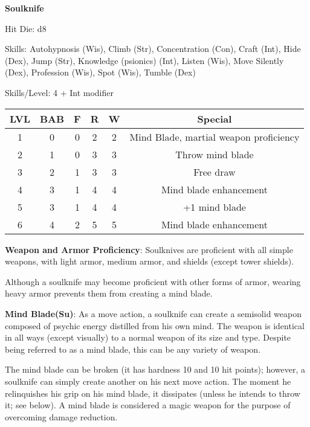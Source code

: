 \textbf{\huge{Soulknife}}

Hit Die: d8

Skills: Autohypnosis (Wis), Climb (Str), Concentration (Con), Craft (Int), Hide (Dex), Jump (Str), Knowledge (psionics) (Int), Listen (Wis), Move Silently (Dex), Profession (Wis), Spot (Wis), Tumble (Dex)

Skills/Level: 4 + Int modifier

\begin{center}
\begin{adjustwidth}{-4cm}{}
\begin{small}
\begin{tabular}{| c | c | c | c | c | c |}
\hline
LVL &BAB &F &R &W &Special \\
\hline
1 &0 &0 &2 &2 &Mind Blade, martial weapon proficiency \\
2 &1 &0 &3 &3 &Throw mind blade \\
3 &2 &1 &3 &3 &Free draw \\
4 &3 &1 &4 &4 &Mind blade enhancement \\
5 &3 &1 &4 &4 &+1 mind blade \\
6 &4 &2 &5 &5 &Mind blade enhancement \\
\hline
\end{tabular}
\end{small}
\end{adjustwidth}
\end{center}

\textbf{Weapon and Armor Proficiency}: Soulknives are proficient with all simple weapons, with light armor, medium armor, and shields (except tower shields).

Although a soulknife may become proficient with other forms of armor, wearing heavy armor prevents them from creating a mind blade.

\textbf{Mind Blade(Su)}: As a move action, a soulknife can create a semisolid weapon composed of psychic energy distilled from his own mind. The weapon is identical in all ways (except visually) to a normal weapon of its size and type. Despite being referred to as a mind blade, this can be any variety of weapon.

The mind blade can be broken (it has hardness 10 and 10 hit points); however, a soulknife can simply create another on his next move action. The moment he relinquishes his grip on his mind blade, it dissipates (unless he intends to throw it; see below). A mind blade is considered a magic weapon for the purpose of overcoming damage reduction.

